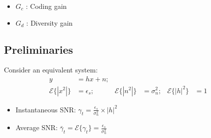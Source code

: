 \documentclass[a4paper, 10pt]{article}
\begin{document}
\hfill
\begin{minipage}[hbt]{5cm}
	\centering
		\begin{itemize}
			\item $G_c$ : Coding gain
			\item $G_d$ : Diversity gain
		\end{itemize}
\end{minipage}

\subsection{Preliminaries}
Consider an equivalent system:
\begin{align*}
	y &= hx +n;\\
	\mathcal{E}\{|x^2|\} &= \epsilon_s; & \mathcal{E}\{|n^2|\} &= \sigma_n^2; & \mathcal{E}\{|h|^2\} &= 1
\end{align*}
\begin{itemize}
	\item Instantaneous SNR: $\gamma_t = \frac{\epsilon_s}{\sigma_n^2}\times |h|^2$
\item Average SNR: $\bar{\gamma}_t = \mathcal{E}\{\gamma_t\} = \frac{\epsilon_s}{\sigma_n^2}$
\end{itemize}
\end{document}
